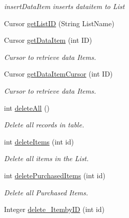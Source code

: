 \begin{DoxyCompactItemize}
\begin{DoxyCompactList}\small\item\em insert\+Data\+Item inserts dataitem to List \end{DoxyCompactList}\item 
Cursor \hyperlink{classcom_1_1example_1_1santh_1_1shoppinglist_1_1_data_base_manager_acd3ba4e19bc7373d4a5f8a307d5c8033}{get\+List\+ID} (String List\+Name)
\item 
Cursor \hyperlink{classcom_1_1example_1_1santh_1_1shoppinglist_1_1_data_base_manager_aa0c1294c6cfc190e00ea11cd6ce6e7ab}{get\+Data\+Item} (int ID)
\begin{DoxyCompactList}\small\item\em Cursor to retrieve data Items. \end{DoxyCompactList}\item 
Cursor \hyperlink{classcom_1_1example_1_1santh_1_1shoppinglist_1_1_data_base_manager_ae4d9ebaa83b3f8503be7b61934bede1b}{get\+Data\+Item\+Cursor} (int ID)
\begin{DoxyCompactList}\small\item\em Cursor to retrieve data Items. \end{DoxyCompactList}\item 
int \hyperlink{classcom_1_1example_1_1santh_1_1shoppinglist_1_1_data_base_manager_aab89b395809febbaf076df571682e57c}{delete\+All} ()
\begin{DoxyCompactList}\small\item\em Delete all records in table. \end{DoxyCompactList}\item 
int \hyperlink{classcom_1_1example_1_1santh_1_1shoppinglist_1_1_data_base_manager_a7273944c8c66bc00f49917270c416b10}{delete\+Items} (int id)
\begin{DoxyCompactList}\small\item\em Delete all items in the List. \end{DoxyCompactList}\item 
int \hyperlink{classcom_1_1example_1_1santh_1_1shoppinglist_1_1_data_base_manager_a74cfb98b2cca130b443a125cdcbc23f5}{delete\+Purchased\+Items} (int id)
\begin{DoxyCompactList}\small\item\em Delete all Purchased Items. \end{DoxyCompactList}\item 
Integer \hyperlink{classcom_1_1example_1_1santh_1_1shoppinglist_1_1_data_base_manager_af44b7c8015d708dd893d208d1abd17a9}{delete\+\_\+\+Itemby\+ID} (int id)

\end{DoxyCompactItemize}

